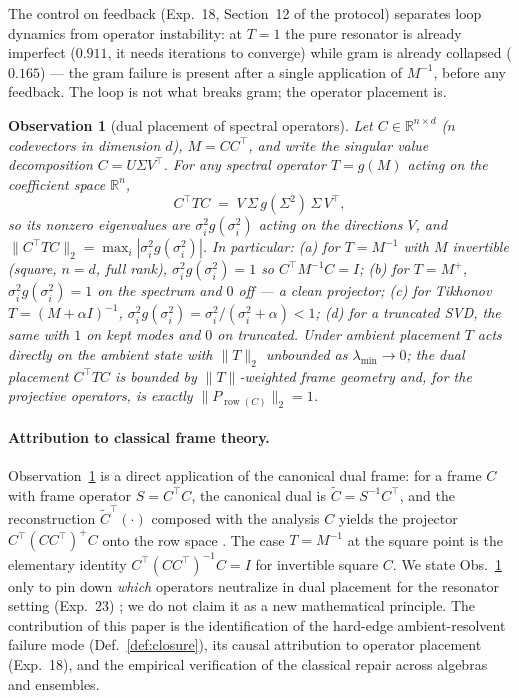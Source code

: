 \documentclass[11pt,a4paper]{article}
\newtheorem{observation}{Observation}
\begin{document}
The control on feedback (Exp.~18, Section~12 of the protocol) separates loop dynamics from operator instability: at $T=1$ the pure resonator is already imperfect ($0.911$, it needs iterations to converge) while gram is already collapsed ($0.165$) --- the gram failure is present after a single application of $M^{-1}$, before any feedback. The loop is not what breaks gram; the operator placement is.

\begin{observation}[dual placement of spectral operators]
\label{obs:fdl}
Let $C \in \mathbb{R}^{n\times d}$ ($n$ codevectors in dimension $d$), $M = CC^{\top}$, and write the singular value decomposition $C = U\Sigma V^{\top}$. For any spectral operator $T = g(M)$ acting on the coefficient space $\mathbb{R}^{n}$,
\[
  C^{\top} T C \;=\; V \,\Sigma\, g(\Sigma^{2})\, \Sigma\, V^{\top},
\]
so its nonzero eigenvalues are $\sigma_i^{2} g(\sigma_i^{2})$ acting on the directions $V$, and $\|C^{\top} T C\|_2 = \max_i |\sigma_i^{2} g(\sigma_i^{2})|$. In particular:
(a) for $T = M^{-1}$ with $M$ invertible (square, $n=d$, full rank), $\sigma_i^{2}g(\sigma_i^2) = 1$ so $C^{\top} M^{-1} C = I$;
(b) for $T = M^{+}$, $\sigma_i^{2} g(\sigma_i^2) = 1$ on the spectrum and $0$ off --- a clean projector;
(c) for Tikhonov $T = (M + \alpha I)^{-1}$, $\sigma_i^{2}g(\sigma_i^2) = \sigma_i^{2}/(\sigma_i^{2} + \alpha) < 1$;
(d) for a truncated SVD, the same with $1$ on kept modes and $0$ on truncated.
Under ambient placement $T$ acts directly on the ambient state with $\|T\|_2$ unbounded as $\lambda_{\min} \to 0$; the dual placement $C^{\top} T C$ is bounded by $\|T\|$-weighted frame geometry and, for the projective operators, is exactly $\|P_{\operatorname{row}(C)}\|_2 = 1$.
\end{observation}

\paragraph{Attribution to classical frame theory.} Observation~\ref{obs:fdl} is a direct application of the canonical dual frame: for a frame $C$ with frame operator $S = C^{\top} C$, the canonical dual is $\tilde{C} = S^{-1} C^{\top}$, and the reconstruction $\tilde{C}^{\top} (\cdot)$ composed with the analysis $C$ yields the projector $C^{\top} (C C^{\top})^{+} C$ onto the row space \citep{duffin1952class, christensen2016introduction}. The case $T = M^{-1}$ at the square point is the elementary identity $C^{\top}(CC^{\top})^{-1}C = I$ for invertible square $C$. We state Obs.~\ref{obs:fdl} only to pin down \emph{which} operators neutralize in dual placement for the resonator setting (Exp.~23) \citep{frady2020resonator, kent2020resonator}; we do not claim it as a new mathematical principle. The contribution of this paper is the identification of the hard-edge ambient-resolvent failure mode (Def.~\ref{def:closure}), its causal attribution to operator placement (Exp.~18), and the empirical verification of the classical repair across algebras and ensembles.
\end{document}
